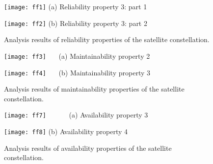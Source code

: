 \documentclass[preprint,12pt]{qrei}
\begin{document}
\begin{figure*}[ht]
\begin{minipage}[htbp]{0.5\linewidth}
\centering
\texttt{[image: ff1]}
\footnotesize{(a) Reliability property 3: part 1}
\end{minipage}
\begin{minipage}[htbp]{0.5\linewidth}
\centering
\texttt{[image: ff2]}
\footnotesize{(b) Reliability property 3: part 2}
\end{minipage}
\caption{Analysis results of reliability properties of the satellite constellation.}
\label{fig:four}
\end{figure*}

\begin{figure*}[ht]
\begin{minipage}[htbp]{0.5\linewidth}
\centering
\texttt{[image: ff3]}
\footnotesize{\ \ \ (a) Maintainability property 2}
\end{minipage}
\begin{minipage}[htbp]{0.5\linewidth}
\centering
\texttt{[image: ff4]}
\footnotesize{\ \ \ (b) Maintainability property 3}
\end{minipage}
\caption{Analysis results of maintainability properties of the satellite constellation.}
\label{fig:five}
\end{figure*}

\begin{figure*}[ht]
\begin{minipage}[htbp]{0.5\linewidth}
\centering
\texttt{[image: ff7]}
\footnotesize{\ \ \ \ \ \ (a) Availability property 3}
\end{minipage}
\begin{minipage}[htbp]{0.5\linewidth}
\centering
\texttt{[image: ff8]}
\footnotesize{(b) Availability property 4}
\end{minipage}
\caption{Analysis results of availability properties of the satellite constellation.}
\label{fig:six}
\end{figure*}
\end{document}
